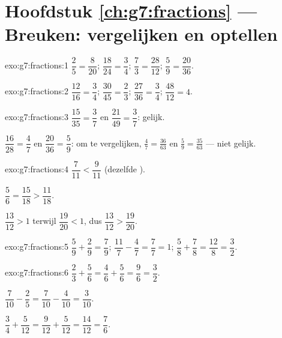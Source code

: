 \section*{Hoofdstuk \ref{ch:g7:fractions} --- Breuken: vergelijken en optellen}

\begin{solution}{exo:g7:fractions:1}
$\dfrac{2}{5} = \dfrac{8}{20}$; \quad
$\dfrac{18}{24} = \dfrac{3}{4}$; \quad
$\dfrac{7}{3} = \dfrac{28}{12}$; \quad
$\dfrac{5}{9} = \dfrac{20}{36}$.
\end{solution}

\begin{solution}{exo:g7:fractions:2}
$\dfrac{12}{16} = \dfrac34$; \quad
$\dfrac{30}{45} = \dfrac23$; \quad
$\dfrac{27}{36} = \dfrac34$; \quad
$\dfrac{48}{12} = 4$.
\end{solution}

\begin{solution}{exo:g7:fractions:3}
$\dfrac{15}{35} = \dfrac37$ en $\dfrac{21}{49} = \dfrac37$: gelijk.

$\dfrac{16}{28} = \dfrac47$ en $\dfrac{20}{36} = \dfrac59$: om te vergelijken,
$\frac47 = \frac{36}{63}$ en $\frac59 = \frac{35}{63}$ --- niet gelijk.
\end{solution}

\begin{solution}{exo:g7:fractions:4}
$\dfrac{7}{11} < \dfrac{9}{11}$ (dezelfde ).

$\dfrac56 = \dfrac{15}{18} > \dfrac{11}{18}$.

$\dfrac{13}{12} > 1$ terwijl $\dfrac{19}{20} < 1$, dus
$\dfrac{13}{12} > \dfrac{19}{20}$.
\end{solution}

\begin{solution}{exo:g7:fractions:5}
$\dfrac59 + \dfrac29 = \dfrac79$; \quad
$\dfrac{11}{7} - \dfrac47 = \dfrac77 = 1$; \quad
$\dfrac58 + \dfrac78 = \dfrac{12}{8} = \dfrac32$.
\end{solution}

\begin{solution}{exo:g7:fractions:6}
$\dfrac23 + \dfrac56 = \dfrac46 + \dfrac56 = \dfrac96 = \dfrac32$.

$\dfrac{7}{10} - \dfrac25 = \dfrac{7}{10} - \dfrac{4}{10} = \dfrac{3}{10}$.

$\dfrac34 + \dfrac{5}{12} = \dfrac{9}{12} + \dfrac{5}{12} = \dfrac{14}{12} =
\dfrac76$.
\end{solution}

